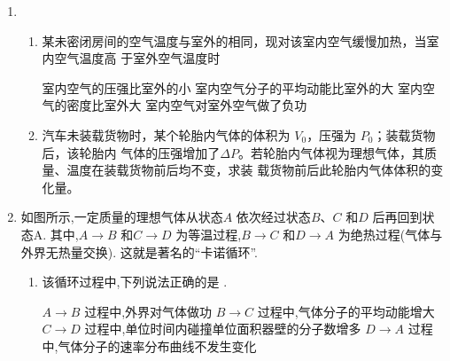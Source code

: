 \begin{enumerate}
\begin{enumerate}



\end{enumerate}


\item 
{}
 \begin{enumerate}
 	\item
某未密闭房间的空气温度与室外的相同，现对该室内空气缓慢加热，当室内空气温度高
于室外空气温度时  

\fourchoices
{室内空气的压强比室外的小}
{室内空气分子的平均动能比室外的大}
{室内空气的密度比室外大}
{室内空气对室外空气做了负功}

\item 
汽车未装载货物时，某个轮胎内气体的体积为 $ V_{0} $，压强为 $ P_{0} $；装载货物后，该轮胎内
气体的压强增加了$ \Delta P $。若轮胎内气体视为理想气体，其质量、温度在装载货物前后均不变，求装
载货物前后此轮胎内气体体积的变化量。



\end{enumerate}


\item
{}
如图所示,一定质量的理想气体从状态$ A $ 依次经过状态$ B $、$ C $ 和$ D $ 后再回到状态A. 其中,$ A \rightarrow B $ 和$ C \rightarrow D $
为等温过程,$ B \rightarrow C $ 和$ D \rightarrow A $ 为绝热过程(气体与外界无热量交换). 这就是著名的“卡诺循环”.
\begin{enumerate}
	\item
该循环过程中,下列说法正确的是 \underlinegap .
\begin{figure}[h!]
	\centering
	
\end{figure}

\fourchoices
{$A \rightarrow B $ 过程中,外界对气体做功}
{$B \rightarrow C $ 过程中,气体分子的平均动能增大}
{$C \rightarrow D $ 过程中,单位时间内碰撞单位面积器壁的分子数增多}
{$D \rightarrow A $ 过程中,气体分子的速率分布曲线不发生变化}


\end{enumerate}
\end{enumerate}

